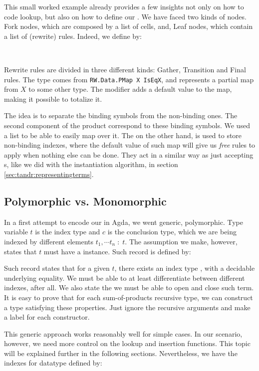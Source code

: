 This small worked example already provides a few insights not only on how to code lookup, but
also on how to define our \mytrie. We have faced two kinds of nodes. Fork nodes, which
are composed by a list of cells, and, Leaf nodes, which contain a list of (rewrite) rules.
Indeed, we define \mytrie by:

\\

Rewrite rules are divided in three different kinds: Gather, Transition and Final rules.
The type  comes from \texttt{\scriptsize RW.Data.PMap X IsEqX}, and represents a partial map
from $X$ to some other type. The  modifier adds a default value to the map, making
it possible to totalize it.

The idea is to separate the binding symbols from the non-binding ones. The second component of the
 product correspond to these binding symbols. We used a list to be able to easily map
over it. The  on the other hand, is used to store non-binding indexes, where the
default value of such map will give us \emph{free} rules to apply when nothing else can be done.
They act in a similar way as just accepting s, like we did with the instantiation
algorithm, in section \ref{sec:tandr:representingterms}.

\subsection{Polymorphic vs. Monomorphic}

In a first attempt to encode our \mytrie in Agda, we went generic, polymorphic. Type variable $t$ is the index 
type and $c$ is the conclusion type, which we are being indexed by different
elements $t_1, \cdots t_n\; :\; t$. The assumption we make, however, states that $t$ must
have a  instance. Such record is defined by:


Such record states that for a given $t$, there exists an index type , with a decidable
underlying equality. We must be able to at least differentiate between different indexes, after all.
We also state the we must be able to open and close such term. It is easy to prove that for each
sum-of-products recursive type, we can construct a type  satisfying these properties.
Just ignore the recursive arguments and make a label for each constructor.

This generic approach works reasonably well for simple cases. In our scenario, however,
we need more control on the lookup and insertion functions. This topic will be explained further
in the following sections. Nevertheless, we have the indexes for  datatype defined by:

